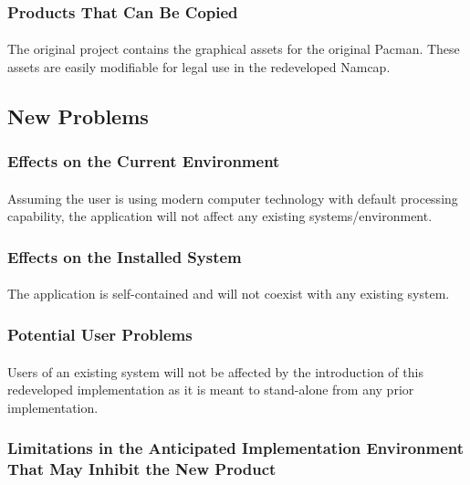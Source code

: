 \documentclass[12pt, titlepage]{article}
\begin{document}
\subsubsection{Products That Can Be Copied}
\paragraph{}
The original project contains the graphical assets for the original Pacman. These assets are easily modifiable for legal use in the redeveloped Namcap.

\subsection{New Problems}

\subsubsection{Effects on the Current Environment}
\paragraph{}
Assuming the user is using modern computer technology with default processing capability, the application will not affect any existing systems/environment.

\subsubsection{Effects on the Installed System}
\paragraph{}
The application is self-contained and will not coexist with any existing system.

\subsubsection{Potential User Problems}
\paragraph{}
Users of an existing system will not be affected by the introduction of this redeveloped implementation as it is meant to stand-alone from any prior implementation.

\subsubsection{Limitations in the Anticipated Implementation Environment That May Inhibit the New Product}
\end{document}
